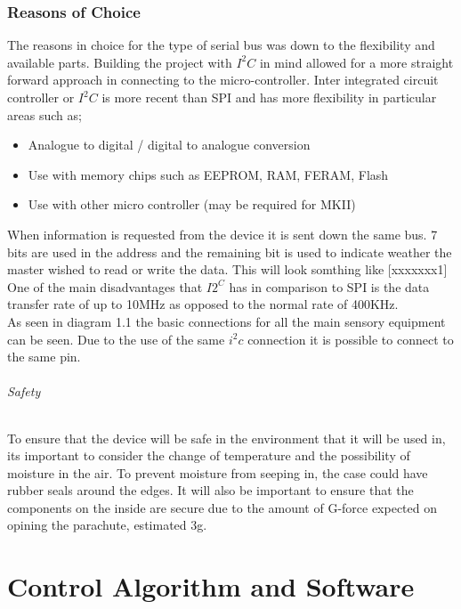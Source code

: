 \documentclass{report}
\begin{document}
\subsection{Reasons of Choice}
The reasons in choice for the type of serial bus was down to the flexibility and available parts. Building the project with $I^2C$ in mind allowed for a more straight forward approach in connecting to the micro-controller. Inter integrated circuit controller or $I^2C$ is more recent than SPI and has more flexibility in particular areas such as;\\

\begin{itemize}
\item Analogue to digital / digital to analogue conversion 
\item Use with memory chips such as EEPROM, RAM, FERAM, Flash
\item Use with other micro controller (may be required for MKII)
\end{itemize}

When information is requested from the device it is sent down the same bus. 7 bits are used in the address and the remaining bit is used to indicate weather the master wished to read or write the data. This will look somthing like [xxxxxxx1]\\
One of the main disadvantages that $I2^C$ has in comparison to SPI is the data transfer rate of up to 10MHz as opposed to the normal rate of 400KHz. \\
As seen in diagram 1.1 the basic connections for all the main sensory equipment can be seen. Due to the use of the same $i^2c$ connection it is possible to connect to the same pin. 

\subparagraph{Safety}
To ensure that the device will be safe in the environment that it will be used in, its important to consider the change of temperature and the possibility of moisture in the air. To prevent moisture from seeping in, the case could have rubber seals around the edges. It will also be important to ensure that the components on the inside are secure due to the amount of G-force expected on opining the parachute, estimated 3g.


\newpage
\chapter{Control Algorithm and Software}
\end{document}
